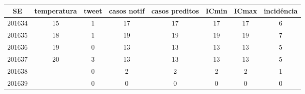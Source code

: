 \begin{tabular}{c|ccccccc}
  \hline
SE & temperatura & tweet & casos notif & casos preditos & ICmin & ICmax & incidência \\ 
  \hline
201634 & 15 & 1 & 17 & 17 & 17 & 17 & 6 \\ 
  201635 & 18 & 1 & 19 & 19 & 19 & 19 & 7 \\ 
  201636 & 19 & 0 & 13 & 13 & 13 & 13 & 5 \\ 
  201637 & 20 & 3 & 13 & 13 & 13 & 13 & 5 \\ 
  201638 &  & 0 & 2 & 2 & 2 & 2 & 1 \\ 
  201639 &  & 0 & 0 & 0 & 0 & 0 & 0 \\ 
   \hline
\end{tabular}
